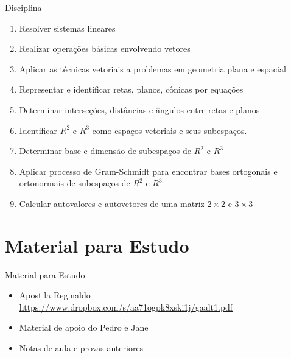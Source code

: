 \documentclass[fleqn,aspectratio=169,12pt]{beamer}
\begin{document}
\begin{frame}{Disciplina}
  \begin{enumerate}[<+->]
    \item Resolver sistemas lineares
    \item Realizar operações básicas envolvendo vetores
    \item Aplicar as técnicas vetoriais a problemas em geometria plana e espacial
    \item Representar e identificar retas, planos, cônicas por equações
    \item Determinar interseções, distâncias e ângulos entre retas e planos
    \item Identificar $R^2$ e $R^3$ como espaços vetoriais e seus subespaços.
    \item Determinar base e dimensão de subespaços de $R^2$ e $R^3$
    \item Aplicar processo de Gram-Schmidt para encontrar bases ortogonais
          e ortonormais de subespaços de $R^2$ e $R^3$
    \item Calcular autovalores e autovetores de uma matriz $2\times 2$ e $3\times 3$
  \end{enumerate}
\end{frame}

\section{Material para Estudo}

\begin{frame}{Material para Estudo}
  \begin{itemize}[<+->]
    \item Apostila Reginaldo \\[2mm]
          \href{https://www.dropbox.com/s/aa71ogpk8xski1j/gaalt1.pdf}%
               {https://www.dropbox.com/s/aa71ogpk8xski1j/gaalt1.pdf}
    \item Material de apoio do Pedro e Jane
    \item Notas de aula e provas anteriores \\[2mm]
          \href{\materialurl}{\materialurl}
  \end{itemize}
\end{frame}
\end{document}
